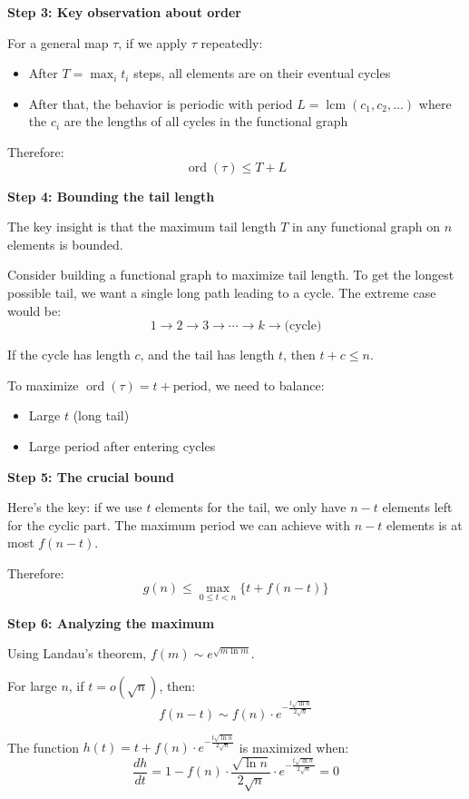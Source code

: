 \documentclass[12pt,a4paper]{article}
\theoremstyle{definition}
\begin{document}
    \textbf{Step 3: Key observation about order}

    For a general map $\tau$, if we apply $\tau$ repeatedly:
    \begin{itemize}
        \item After $T = \max_i t_i$ steps, all elements are on their eventual cycles
        \item After that, the behavior is periodic with period $L = \operatorname{lcm}(c_1, c_2, \ldots)$ where the $c_i$ are the lengths of all cycles in the functional graph
    \end{itemize}

    Therefore:
    $$\operatorname{ord}(\tau) \leq T + L$$

    \textbf{Step 4: Bounding the tail length}

    The key insight is that the maximum tail length $T$ in any functional graph on $n$ elements is bounded.

    Consider building a functional graph to maximize tail length. To get the longest possible tail, we want a single long path leading to a cycle. The extreme case would be:
    $$1 \to 2 \to 3 \to \cdots \to k \to \text{(cycle)}$$

    If the cycle has length $c$, and the tail has length $t$, then $t + c \leq n$.

    To maximize $\operatorname{ord}(\tau) = t + \text{period}$, we need to balance:
    \begin{itemize}
        \item Large $t$ (long tail)
        \item Large period after entering cycles
    \end{itemize}

    \textbf{Step 5: The crucial bound}

    Here's the key: if we use $t$ elements for the tail, we only have $n - t$ elements left for the cyclic part. The maximum period we can achieve with $n - t$ elements is at most $f(n - t)$.

    Therefore:
    $$g(n) \leq \max_{0 \leq t < n} \{t + f(n - t)\}$$

    \textbf{Step 6: Analyzing the maximum}

    Using Landau's theorem, $f(m) \sim e^{\sqrt{m \ln m}}$.

    For large $n$, if $t = o(\sqrt{n})$, then:
    $$f(n - t) \sim f(n) \cdot e^{-\frac{t\sqrt{\ln n}}{2\sqrt{n}}}$$

    The function $h(t) = t + f(n) \cdot e^{-\frac{t\sqrt{\ln n}}{2\sqrt{n}}}$ is maximized when:
    $$\frac{dh}{dt} = 1 - f(n) \cdot \frac{\sqrt{\ln n}}{2\sqrt{n}} \cdot e^{-\frac{t\sqrt{\ln n}}{2\sqrt{n}}} = 0$$
\end{document}
